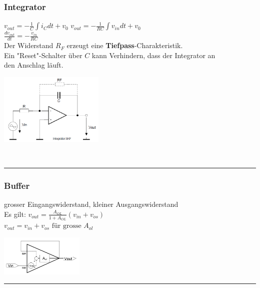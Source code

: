 		\begin{minipage}[c]{12cm}
		\subsubsection{Integrator} 
			$v_{out}=-\frac{1}{C} \int{i_C}dt + v_0$
			$v_{out}=-\frac{1}{RC} \int{v_{in}}dt +
			v_0 $\\
			$\frac{dv_{out}}{dt}=-\frac{v_{in}}{RC}$\\
			Der Widerstand $R_F$ erzeugt eine {\bf Tiefpass}-Charakteristik. \\
			Ein "Reset"-Schalter über $C$ kann Verhindern, dass der Integrator an\\
			den Anschlag läuft.
		\end{minipage} 
		\begin{minipage}[c]{5cm}
          	\includegraphics[width=5cm]{./images/integrator.png} 
        \end{minipage}\\
\hrule

		\begin{minipage}{12cm}
			\subsubsection{Buffer}
				grosser Eingangswiderstand, kleiner Ausgangswiderstand \\
				Es gilt: $v_{out} = \frac{A_{OL}}{1+A_{OL}} (v_{in} + v_{os})$ \\
				$v_{out} = v_{in} + v_{os} \text{ für grosse } A_{ol}$
		\end{minipage}
		\begin{minipage}{5cm}
			\includegraphics[width=4cm]{./images/op-buffer}
		\end{minipage}
\hrule    	
		
